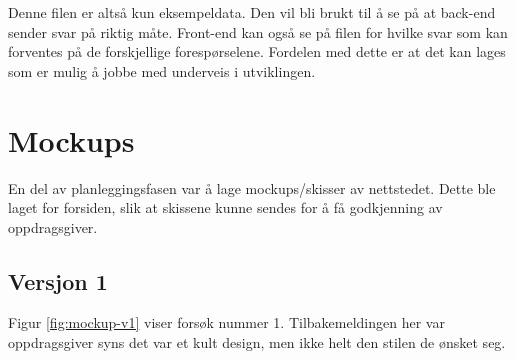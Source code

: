 Denne filen er altså kun eksempeldata. Den vil bli brukt til å se på at back-end sender svar på riktig måte. Front-end kan også se på filen for hvilke svar som kan forventes på de forskjellige forespørselene. Fordelen med dette er at det kan lages  som er mulig å jobbe med underveis i utviklingen.

\section{Mockups}
En del av planleggingsfasen var å lage mockups/skisser av nettstedet. Dette ble laget for forsiden, slik at skissene kunne sendes for å få godkjenning av oppdragsgiver.

\subsection{Versjon 1}
Figur \ref{fig:mockup-v1} viser forsøk nummer 1. Tilbakemeldingen her var oppdragsgiver syns det var et kult design, men ikke helt den stilen de ønsket seg.
